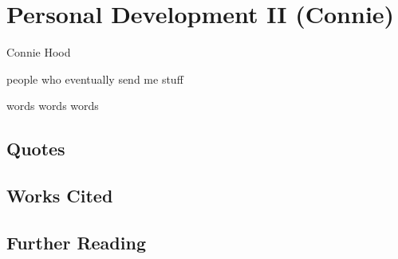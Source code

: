 \chapter{Personal Development II (Connie)}

\begin{authors}
	Connie Hood
\end{authors}

\begin{authors}
	people who eventually send me stuff
\end{authors}

words words words


\section{Quotes}

\section{Works Cited}

\section{Further Reading}


